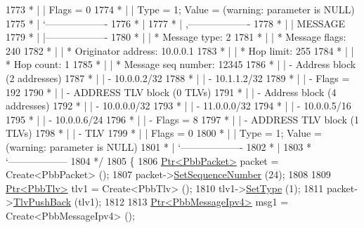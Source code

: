 \begin{DoxyCode}
1773 \textcolor{comment}{         * |    |         Flags = 0}
1774 \textcolor{comment}{         * |    |         Type = 1; Value = (warning: parameter is NULL)}
1775 \textcolor{comment}{         * |    `-------------------}
1776 \textcolor{comment}{         * |}
1777 \textcolor{comment}{         * |    ,-------------------}
1778 \textcolor{comment}{         * |    |  MESSAGE}
1779 \textcolor{comment}{         * |    |-------------------}
1780 \textcolor{comment}{         * |    | * Message type:       2}
1781 \textcolor{comment}{         * |    | * Message flags:  240}
1782 \textcolor{comment}{         * |    | * Originator address: 10.0.0.1}
1783 \textcolor{comment}{         * |    | * Hop limit:          255}
1784 \textcolor{comment}{         * |    | * Hop count:          1}
1785 \textcolor{comment}{         * |    | * Message seq number: 12345}
1786 \textcolor{comment}{         * |    | - Address block (2 addresses)}
1787 \textcolor{comment}{         * |    |     - 10.0.0.2/32}
1788 \textcolor{comment}{         * |    |     - 10.1.1.2/32}
1789 \textcolor{comment}{         * |    |     - Flags = 192}
1790 \textcolor{comment}{         * |    | - ADDRESS TLV block (0 TLVs)}
1791 \textcolor{comment}{         * |    | - Address block (4 addresses)}
1792 \textcolor{comment}{         * |    |     - 10.0.0.0/32}
1793 \textcolor{comment}{         * |    |     - 11.0.0.0/32}
1794 \textcolor{comment}{         * |    |     - 10.0.0.5/16}
1795 \textcolor{comment}{         * |    |     - 10.0.0.6/24}
1796 \textcolor{comment}{         * |    |     - Flags = 8}
1797 \textcolor{comment}{         * |    | - ADDRESS TLV block (1 TLVs)}
1798 \textcolor{comment}{         * |    |     - TLV}
1799 \textcolor{comment}{         * |    |         Flags = 0}
1800 \textcolor{comment}{         * |    |         Type = 1; Value = (warning: parameter is NULL)}
1801 \textcolor{comment}{         * |    `-------------------}
1802 \textcolor{comment}{         * |}
1803 \textcolor{comment}{         * `------------------}
1804 \textcolor{comment}{   */}
1805   \{
1806     \hyperlink{classns3_1_1Ptr}{Ptr<PbbPacket>} packet = Create<PbbPacket> ();
1807     packet->\hyperlink{classns3_1_1PbbPacket_a7d6a1602be86109760d0f26ff9bbbb8e}{SetSequenceNumber} (24);
1808 
1809     \hyperlink{classns3_1_1Ptr}{Ptr<PbbTlv>} tlv1 = Create<PbbTlv> ();
1810     tlv1->\hyperlink{classns3_1_1PbbTlv_a90a0452018ed364ac37c3ad116dd718b}{SetType} (1);
1811     packet->\hyperlink{classns3_1_1PbbPacket_a34935793e729a106c176db99c969cb42}{TlvPushBack} (tlv1);
1812 
1813     \hyperlink{classns3_1_1Ptr}{Ptr<PbbMessageIpv4>} msg1 = Create<PbbMessageIpv4> ();

\end{DoxyCode}
